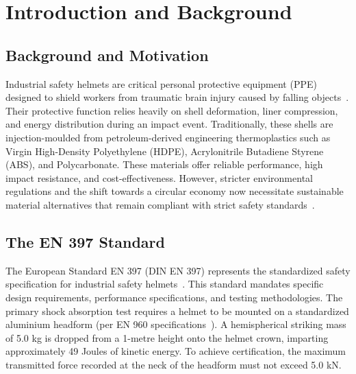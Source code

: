 \chapter{Introduction and Background}

\section{Background and Motivation}
Industrial safety helmets are critical personal protective equipment (PPE) 
designed to shield workers from traumatic brain injury caused by falling 
objects~\cite{long2015, mishra2021}. Their protective function relies heavily on shell deformation, liner 
compression, and energy distribution during an impact event. Traditionally, 
these shells are injection-moulded from petroleum-derived engineering 
thermoplastics such as Virgin High-Density Polyethylene (HDPE), Acrylonitrile 
Butadiene Styrene (ABS), and Polycarbonate. These materials offer reliable 
performance, high impact resistance, and cost-effectiveness. However, stricter 
environmental regulations and the shift towards a circular economy now 
necessitate sustainable material alternatives that remain compliant with strict 
safety standards~\cite{yadav2024}.

\section{The EN 397 Standard}
The European Standard EN 397 (DIN EN 397) represents the standardized safety 
specification for industrial safety helmets~\cite{en397}. This standard mandates specific 
design requirements, performance specifications, and testing methodologies. 
The primary shock absorption test requires a helmet to be mounted on a 
standardized aluminium headform (per EN 960 specifications~\cite{en960}). A hemispherical 
striking mass of 5.0 kg is dropped from a 1-metre height onto the helmet 
crown, imparting approximately 49 Joules of kinetic energy. To achieve 
certification, the maximum transmitted force recorded at the neck of the 
headform must not exceed 5.0 kN.

